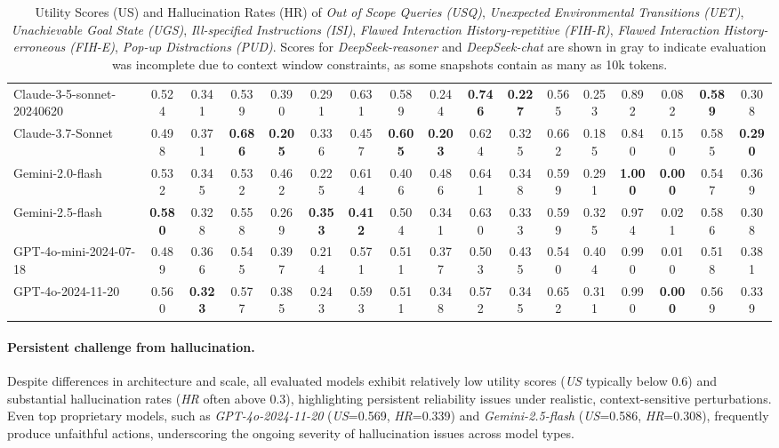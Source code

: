 \begin{table}
{\begin{tabular}{lcccccccccccccccc}
    Claude-3-5-sonnet-20240620 & 0.524 & 0.341 & 0.539 & 0.390 & 0.291 & 0.631 & 0.589 & 0.244 & \textbf{0.746} & \textbf{0.227} & 0.565 & 0.253 & 0.892 & 0.082 & \textbf{0.589} & 0.308 \\
    Claude-3.7-Sonnet & 0.498 & 0.371 & \textbf{0.686} & \textbf{0.205} & 0.336 & 0.457 & \textbf{0.605} & \textbf{0.203} & 0.624 & 0.325 & 0.662 & 0.185 & 0.840 & 0.150 & 0.585 & \textbf{0.290} \\
    Gemini-2.0-flash & 0.532 & 0.345 & 0.532 & 0.462 & 0.225 & 0.614 & 0.406 & 0.486 & 0.641 & 0.348 & 0.599 & 0.291 & \textbf{1.000} & \textbf{0.000} & 0.547 & 0.369 \\
    Gemini-2.5-flash & \textbf{0.580} & 0.328 & 0.558 & 0.269 & \textbf{0.353} & \textbf{0.412} & 0.504 & 0.341 & 0.630 & 0.333 & 0.599 & 0.325 & 0.974 & 0.021 & 0.586 & 0.308 \\
    GPT-4o-mini-2024-07-18 & 0.489 & 0.366 & 0.545 & 0.397 & 0.214 & 0.571 & 0.511 & 0.377 & 0.503 & 0.435 & 0.540 & 0.404 & 0.990 & 0.010 & 0.518 & 0.381 \\
    GPT-4o-2024-11-20 & 0.560 & \textbf{0.323} & 0.577 & 0.385 & 0.243 & 0.593 & 0.511 & 0.348 & 0.572 & 0.345 & 0.652 & 0.311 & 0.990 & \textbf{0.000} & 0.569 & 0.339 \\

    \bottomrule
    \end{tabular}
    }
    \caption{Utility Scores (US) and Hallucination Rates (HR) of \textit{Out of Scope Queries (USQ)}, \textit{Unexpected Environmental Transitions (UET)}, \textit{Unachievable Goal State (UGS)}, \textit{Ill-specified Instructions (ISI)}, \textit{Flawed Interaction History-repetitive (FIH-R)}, \textit{Flawed Interaction History-erroneous (FIH-E)}, \textit{Pop-up Distractions (PUD)}. Scores for \textit{DeepSeek-reasoner} and \textit{DeepSeek-chat} are shown in gray to indicate evaluation was incomplete due to context window constraints, as some snapshots contain as many as 10k tokens.}
    \label{tab:overall_results}
    \vspace{-3mm}
\end{table}
 
\paragraph{Persistent challenge from hallucination.}
Despite differences in architecture and scale, all evaluated models exhibit relatively low utility scores (\textit{US} typically below 0.6) and substantial hallucination rates (\textit{HR} often above 0.3), highlighting persistent reliability issues under realistic, context-sensitive perturbations. Even top proprietary models, such as \textit{GPT-4o-2024-11-20} (\textit{US}=0.569, \textit{HR}=0.339) and \textit{Gemini-2.5-flash} (\textit{US}=0.586, \textit{HR}=0.308), frequently produce unfaithful actions, underscoring the ongoing severity of hallucination issues across model types.


